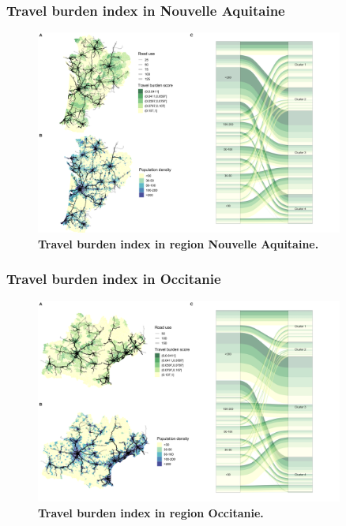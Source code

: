 \subsubsection{Travel burden index in Nouvelle Aquitaine}

\begin{figure}[H]
    \includegraphics[width=0.9\textwidth]{images/routes/fig4_75.png}
    \centering
    \caption{
        \textbf{Travel burden index in region Nouvelle Aquitaine.}
    }
    \label{fig:routes-burden-index-na}
\end{figure}

\subsubsection{Travel burden index in Occitanie}

\begin{figure}[H]
    \includegraphics[width=0.9\textwidth]{images/routes/fig4_76.png}
    \centering
    \caption{
        \textbf{Travel burden index in region Occitanie.}
    }
    \label{fig:routes-burden-index-occitanie}
\end{figure}

